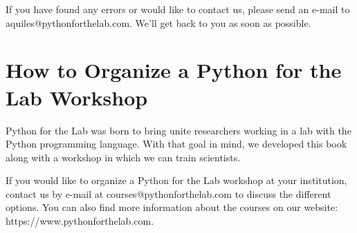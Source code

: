 \sloppy If you have found any errors or would like to contact us, please send an e-mail to {aquiles@pythonforthelab.com}. We'll get back to you as soon as possible.

\section{How to Organize a Python for the Lab Workshop}\label{sec:organizing-a-python-for-the-lab-workshop}
Python for the Lab was born to bring unite researchers working in a lab with the Python programming language. With that goal in mind, we developed this book along with a workshop in which we can train scientists.

\sloppy If you would like to organize a Python for the Lab workshop at your institution, contact us by e-mail at {courses@pythonforthelab.com} to discuss the different options. You can also find more information about the courses on our website: {https://www.pythonforthelab.com}.
